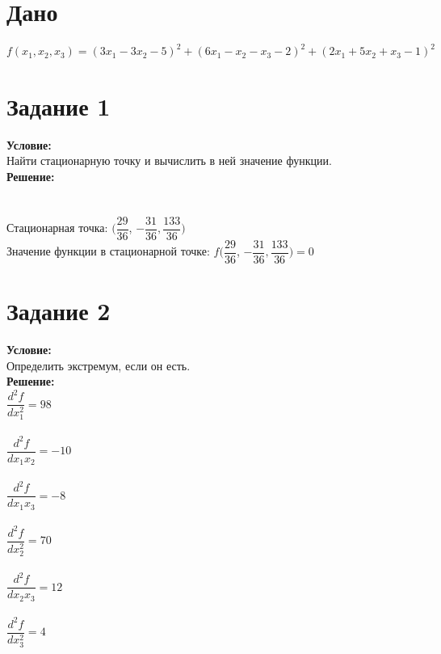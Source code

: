 \documentclass[14pt,a4paper,fleqn]{extarticle}
\begin{document}
	\section*{Дано}
	$f(x_1,x_2,x_3) = (3x_1-3x_2-5)^2 + (6x_1-x_2-x_3-2)^2+(2x_1+5x_2+x_3-1)^2$
	\section*{Задание 1}
	\textbf{Условие:}\\
	Найти стационарную точку и вычислить в ней значение функции.\\
	
	\textbf{Решение:}\\
	
	\\\\
	
	Стационарная точка: $(\dfrac{29}{36}$, $-\dfrac{31}{36}, \dfrac{133}{36})$\\
	Значение функции в стационарной точке: $f(\dfrac{29}{36}$, $-\dfrac{31}{36}, \dfrac{133}{36}) = 0$
	
	\section*{Задание 2}
	\textbf{Условие:}\\
	Определить экстремум, если он есть.\\
	
	\textbf{Решение:}\\
	
	$\dfrac{d^2f}{dx_1^2} = 98$\\\\
	$\dfrac{d^2f}{dx_1x_2} = -10$\\\\
	$\dfrac{d^2f}{dx_1x_3} = -8$\\\\
	$\dfrac{d^2f}{dx_2^2} = 70$\\\\
	$\dfrac{d^2f}{dx_2x_3} = 12$\\\\
	$\dfrac{d^2f}{dx_3^2} = 4$\\
	
\end{document}
